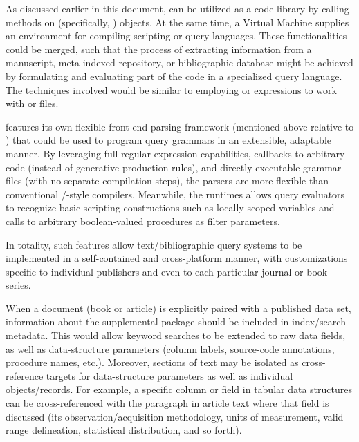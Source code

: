\documentclass[11pt]{article}
\begin{document}
{\begin{description}
\vspace*{-4pt}

\item[Full-Text Query Languages]  As discussed earlier in this 
document, \PacTk{} can be utilized as a code library by 
calling methods on \Cpp{} (specifically, \TSOM{}) objects.  
At the same time, a \PacTk{} Virtual Machine supplies an  
environment for compiling scripting or query languages.  
These functionalities could be merged, such that the process 
of extracting information from a \PDF{} manuscript, 
meta-indexed repository, or bibliographic database might be 
achieved by formulating and evaluating part of the code in a 
specialized query language.  The techniques involved 
would be similar to employing \XQuery{} or \XQSE{} 
expressions to work with \JATS{} or \BITS{} files.

\pseudoIndent{} \lPacTk{} features its own flexible front-end parsing 
framework (mentioned above relative to \GTagML{}) that 
could be used to program query grammars in an extensible, 
adaptable manner.  By leveraging full regular expression 
capabilities, callbacks to arbitrary code (instead of 
generative production rules), and directly-executable 
grammar files (with no separate compilation steps), 
the \PacTk{} parsers are more flexible than conventional 
\LEX{}/\YACC{}-style compilers.  Meanwhile, the \VM{} 
runtimes allows query evaluators to recognize basic 
scripting constructions such as locally-scoped variables 
and calls to arbitrary boolean-valued procedures as 
filter parameters.

\pseudoIndent{} In totality, such features allow 
text/bibliographic query systems to be implemented 
in a self-contained and cross-platform manner, 
with customizations specific to individual publishers 
and even to each particular journal or book series.  

\vspace*{-4pt}


\item[Multimedia Cross-Referencing]  When a document (book or article) is explicitly paired with a 
published data set, information about the supplemental package should be 
included in index/search metadata.  This would allow 
keyword searches to be extended to raw data fields, as well 
as data-structure parameters (column labels, source-code 
annotations, procedure names, etc.).  Moreover, sections of text 
may be isolated as cross-reference targets for data-structure parameters 
as well as individual objects/records.  For example, a specific 
column or field in tabular data structures can be cross-referenced 
with the paragraph in article text where that field is 
discussed (its observation/acquisition methodology, units of measurement, 
valid range delineation, statistical distribution, and so forth).


\end{description}}
\end{document}
